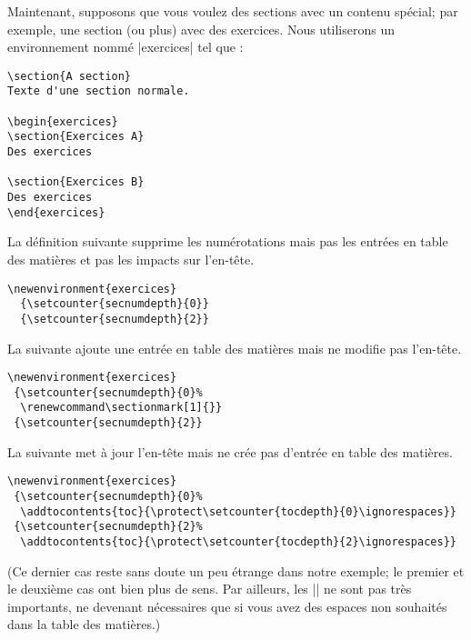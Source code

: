 \documentclass[a4paper]{ltxguide}
\begin{document}
Maintenant, supposons que vous voulez des sections avec un contenu spécial; par
exemple, une section (ou plus) avec des exercices. Nous utiliserons un
environnement nommé |exercices| tel que : 
\begin{verbatim}
\section{A section}
Texte d'une section normale.

\begin{exercices}
\section{Exercices A}
Des exercices

\section{Exercices B}
Des exercices
\end{exercices}
\end{verbatim}

La définition suivante supprime les numérotations mais pas les entrées en
table des matières et pas les impacts sur l'en-tête.
\begin{verbatim}
\newenvironment{exercices}
  {\setcounter{secnumdepth}{0}}
  {\setcounter{secnumdepth}{2}}
\end{verbatim}

La suivante ajoute une entrée en table des matières mais ne modifie pas
l'en-tête.
\begin{verbatim}
\newenvironment{exercices}
 {\setcounter{secnumdepth}{0}%
  \renewcommand\sectionmark[1]{}}
 {\setcounter{secnumdepth}{2}}
\end{verbatim}

La suivante met à jour l'en-tête mais ne crée pas d'entrée en table des
matières.
\begin{verbatim}
\newenvironment{exercices}
 {\setcounter{secnumdepth}{0}%
  \addtocontents{toc}{\protect\setcounter{tocdepth}{0}\ignorespaces}}
 {\setcounter{secnumdepth}{2}%
  \addtocontents{toc}{\protect\setcounter{tocdepth}{2}\ignorespaces}}
\end{verbatim}
(Ce dernier cas reste sans doute un peu étrange dans notre exemple; le premier
et le deuxième cas ont bien plus de sens. Par ailleurs, les |\ignorespaces| ne
sont pas très importants, ne devenant nécessaires que si vous avez des espaces
non souhaités dans la table des matières.) 
\end{document}

